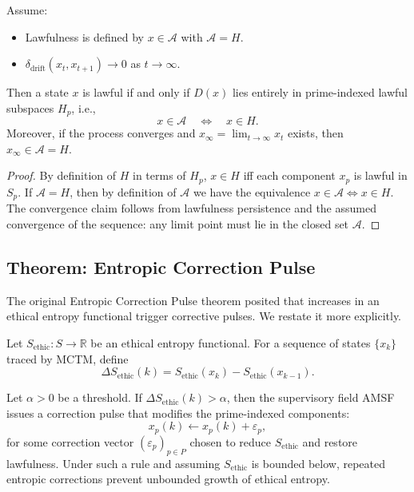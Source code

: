 \documentclass[11pt]{article}
\begin{document}
\begin{theorem}
Assume:
\begin{itemize}
  \item Lawfulness is defined by \(x \in \mathcal{A}\) with \(\mathcal{A} = H\).
  \item \(\delta_{\mathrm{drift}}(x_t, x_{t+1}) \to 0\) as \(t \to \infty\).
\end{itemize}
Then a state \(x\) is lawful if and only if \(D(x)\) lies entirely in prime-indexed lawful subspaces \(H_p\), i.e.,
\[
  x \in \mathcal{A} \quad\Longleftrightarrow\quad x \in H.
\]
Moreover, if the process converges and \(x_\infty = \lim_{t \to \infty} x_t\) exists, then \(x_\infty \in \mathcal{A} = H\).
\end{theorem}

\begin{proof}
By definition of \(H\) in terms of \(H_p\), \(x \in H\) iff each component \(x_p\) is lawful in \(S_p\).%
If \(\mathcal{A} = H\), then by definition of \(\mathcal{A}\) we have the equivalence \(x \in \mathcal{A} \iff x \in H\).%
The convergence claim follows from lawfulness persistence and the assumed convergence of the sequence: any limit point must lie in the closed set \(\mathcal{A}\).%
\end{proof}

\subsection{Theorem: Entropic Correction Pulse}

The original Entropic Correction Pulse theorem posited that increases in an ethical entropy functional trigger corrective pulses.%
We restate it more explicitly.

\begin{definition}
Let \(S_{\mathrm{ethic}} : S \to \mathbb{R}\) be an ethical entropy functional.%
For a sequence of states \(\{x_k\}\) traced by MCTM, define
\[
  \Delta S_{\mathrm{ethic}}(k) = S_{\mathrm{ethic}}(x_k) - S_{\mathrm{ethic}}(x_{k-1}).
\]
\end{definition}

\begin{theorem}
Let \(\alpha > 0\) be a threshold.%
If \(\Delta S_{\mathrm{ethic}}(k) > \alpha\), then the supervisory field AMSF issues a correction pulse that modifies the prime-indexed components:
\[
  x_{p}(k) \leftarrow x_{p}(k) + \varepsilon_{p},
\]
for some correction vector \((\varepsilon_p)_{p \in P}\) chosen to reduce \(S_{\mathrm{ethic}}\) and restore lawfulness.%
Under such a rule and assuming \(S_{\mathrm{ethic}}\) is bounded below, repeated entropic corrections prevent unbounded growth of ethical entropy.
\end{theorem}
\end{document}
